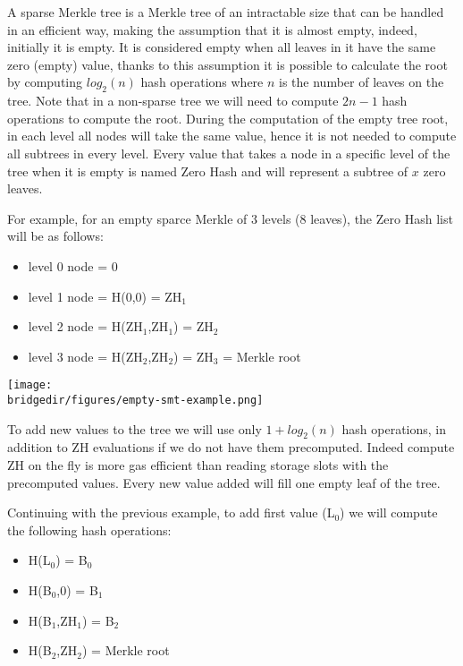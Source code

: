 A sparse Merkle tree is a Merkle tree of an intractable size that can be handled in an efficient way, making the assumption that it is almost empty, indeed, initially it is empty. It is considered empty when all leaves in it have the same zero (empty) value, thanks to this assumption it is possible to calculate the root by computing $log_{2}(n)$ hash operations where $n$ is the number of leaves on the tree. Note that in a non-sparse tree we will need to compute $2n-1$ hash operations to compute the root. During the computation of the empty tree root, in each level all nodes will take the same value, hence it is not needed to compute all subtrees in every level. Every value that takes a node in a specific level of the tree when it is empty is named Zero Hash and will represent a subtree of $x$ zero leaves. 


For example, for an empty sparce Merkle of 3 levels (8 leaves), the Zero Hash list will be as follows:
\begin{itemize}
	\item level 0 node = 0
	\item level 1 node = H(0,0) = ZH$_{1}$
	\item level 2 node = H(ZH$_{1}$,ZH$_{1}$) = ZH$_{2}$
	\item level 3 node  = H(ZH$_{2}$,ZH$_{2}$) = ZH$_{3}$ = Merkle root
	
\end{itemize}

\begin{center}
	\texttt{[image: \\bridgedir/figures/empty-smt-example.png]}
	
\end{center}

To add new values to the tree we will use only $1  + log_{2}(n)$ hash operations, in addition to ZH evaluations if we do not have them precomputed. Indeed compute ZH on the fly is more gas efficient than reading storage slots with the precomputed values. Every new value added will fill one empty leaf of the tree. 

Continuing with the previous example, to add first value (L$_{0}$) we will compute the following hash operations:
\begin{itemize}
	\item H(L$_{0}$)   = B$_{0}$
	\item H(B$_{0}$,0) = B$_{1}$
	\item H(B$_{1}$,ZH$_{1}$) = B$_{2}$
	\item H(B$_{2}$,ZH$_{2}$) = Merkle root
\end{itemize}

